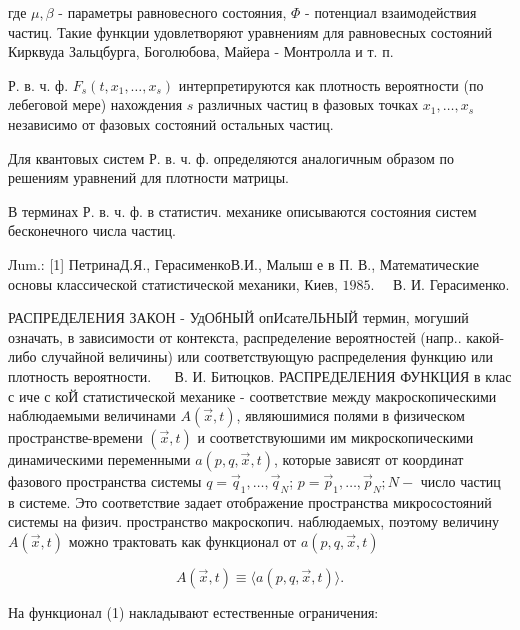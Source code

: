 \documentclass[10pt]{article}
\begin{document}
где $\mu, \beta$ - параметры равновесного состояния, $\Phi$ - потенциал взаимодействия частиц. Такие функции удовлетворяют уравнениям для равновесных состояний Кирквуда Зальцбурга, Боголюбова, Майера - Монтролла и т. п.



Р. в. ч. ф. $F_{s}\left(t, x_{1}, \ldots, x_{s}\right)$ интерпретируются как плотность вероятности (по лебеговой мере) нахождения $s$ различных частиц в фазовых точках $x_{1}, \ldots, x_{s}$ независимо от фазовых состояний остальных частиц.



Для квантовых систем Р. в. ч. ф. определяются аналогичным образом по решениям уравнений для плотности матрицы.



В терминах Р. в. ч. ф. в статистич. механике описываются состояния систем бесконечного числа частиц.



Лum.: [1] ПетринаД.Я., ГерасименкоВ.И., Малыш е в П. В., Математические основы классической статистической механики, Киев, $1985 . \quad$ В. И. Герасименко.



РАСПРЕДЕЛЕНИЯ ЗАКОН - УдОбНЫЙ опИсатеЛЬНЫЙ термин, могуший означать, в зависимости от контекста, распределение вероятностей (напр.. какой-либо случайной величины) или соответствующую распределения функцию или плотность вероятности. $\quad$ В. И. Битюцков. РАСПРЕДЕЛЕНИЯ ФУНКЦИЯ в клас с иче с коЙ статистической механике - соответствие между макроскопическими наблюдаемыми величинами $A(\vec{x}, t)$, являюшимися полями в физическом пространстве-времени $(\vec{x}, t)$ и соответствуюшими им микроскопическими динамическими переменными $a(p, q, \vec{x}, t)$, которые зависят от координат фазового пространства системы $q=\vec{q}_{1}, \ldots, \vec{q}_{N}$; $p=\vec{p}_{1}, \ldots, \vec{p}_{N} ; N-$ число частиц в системе. Это соответствие задает отображение пространства микросостояний системы на физич. пространство макроскопич. наблюдаемых, поэтому величину $A(\vec{x}, t)$ можно трактовать как функционал от $a(p, q, \vec{x}, t)$



\[

A(\vec{x}, t) \equiv\langle a(p, q, \vec{x}, t)\rangle .

\]



На функционал (1) накладывают естественные ограничения:
\end{document}
